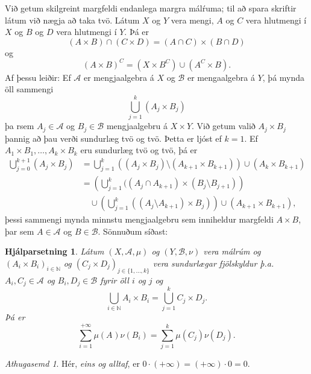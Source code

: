\documentclass[a4paper,icelandic,11pt]{book}
\theoremstyle{plain}      \newtheorem{setn}{Setning}[chapter]
\newtheorem{lemma}[setn]{Hjálparsetning}
\theoremstyle{definition} \newtheorem{skilgr}[setn]{Skilgreining}
\theoremstyle{remark}     \newtheorem*{ath}{Athugasemd}
\newcommand{\N}{\mathbb N}
\begin{document}
Við getum skilgreint margfeldi endanlega margra málŕuma; til að spara
skriftir látum við nægja að taka tvö. Látum $X$ og $Y$ vera mengi, $A$
og $C$ vera hlutmengi í $X$ og $B$ og $D$ vera hlutmengi í $Y$. Þá er 
\[
(A\times B) \cap (C\times D) 
= (A\cap C)\times(B\cap D)
\]
og 
\[
(A\times B)^C
= (X\times B^C)\cup (A^C\times B).
\]
Af þessu leiðir: Ef $\mathcal A$ er mengjaalgebra á $X$ og $\mathcal B$
er mengaalgebra á $Y$, þá mynda öll sammengi 
\[
\bigcup_{j=1}^k (A_j\times B_j)
\]
þa rsem $A_j\in\mathcal A$ og $B_j\in\mathcal B$ mengjaalgebru á
$X\times Y$. Við getum valið $A_j\times B_j$ þannig að þau verði
sundurlæg tvö og tvö. Þetta er ljóst ef $k=1$. Ef $A_1\times
B_1,\dots,A_k\times B_k$ eru sundurlæg tvö og tvö, þá er 
\begin{align*}
  \bigcup_{j=0}^{k+1}(A_j\times B_j)
  &= \bigcup_{j=1}^k ( (A_j\times B_j) \setminus (A_{k+1}\times
  B_{k+1})) \cup (A_k \times B_{k+1})
  \\
  &= \left(
    \bigcup_{j=1}^k 
    ((A_j\cap A_{k+1})\times(B_j\setminus B_{j+1}) 
  \right)
  \\
  &\quad \cup \left( 
    \bigcup_{j=1}^k ( (A_j\setminus A_{k+1})\times B_j)
  \right)
  \cup (A_{k+1}\times B_{k+1}),
\end{align*}
þessi sammengi mynda minnstu mengjaalgebru sem inniheldur margfeldi
$A\times B$, þar sem $A\in\mathcal A$ og $B\in\mathcal B$.
Sönnuðum síðast:
\begin{lemma}
  Látum $(X,\mathcal A,\mu)$ og $(Y,\mathcal B,\nu)$ vera málrúm og
  $(A_{i}\times B_{i})_{i\in\N}$ og $(C_{j}\times D_{j})_{j\in
    \{1,\dots,k\}}$ vera sundurlægar fjölskyldur
  þ.a. $A_{i},C_{j}\in\mathcal A$ og $B_{i},D_{j}\in\mathcal B$ fyrir
  öll $i$ og $j$ og
  \[
  \bigcup_{i\in\N} A_{i}\times B_{i}
  = \bigcup_{j=1}^{k} C_{j}\times D_{j}.
  \]
  Þá er 
  \[
  \sum_{i=1}^{+\infty}\mu(A_{})\nu(B_{i})
  = \sum_{j=1}^{k}\mu(C_{j})\nu(D_{j}).
  \]
\end{lemma}
\begin{ath}
  Hér, \emph{eins og alltaf}, er $0\cdot(+\infty) = (+\infty)\cdot 0 = 0$.
\end{ath}
\end{document}
